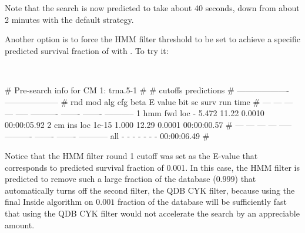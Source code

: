 Note that the search is now predicted to take about 40 seconds, down
from about 2 minutes with the default strategy.

Another option is to force the HMM filter threshold to be set to
achieve a specific predicted survival fraction of  with
. To try it:

\\

\begin{sreoutput}
# Pre-search info for CM 1: trna.5-1
#
#                                  cutoffs            predictions     
#                            -------------------  --------------------
# rnd  mod  alg  cfg   beta     E value   bit sc     surv     run time
# ---  ---  ---  ---  -----  ----------  -------  -------  -----------
    1  hmm  fwd  loc      -       5.472    11.22   0.0010  00:00:05.92
    2   cm  ins  loc  1e-15       1.000    12.29   0.0001  00:00:00.57
# ---  ---  ---  ---  -----  ----------  -------  -------  -----------
  all    -    -    -      -           -        -        -  00:00:06.49
#
\end{sreoutput}

Notice that the HMM filter round 1 cutoff was set as the E-value that
corresponds to predicted survival fraction of 0.001. In this case, the
HMM filter is predicted to remove such a large fraction of the
database ($0.999$) that  automatically turns off the
second filter, the QDB CYK filter, because using the final Inside
algorithm on $0.001$ fraction of the database will be sufficiently
fast that using the QDB CYK filter would not accelerate the search by an 
appreciable amount.


